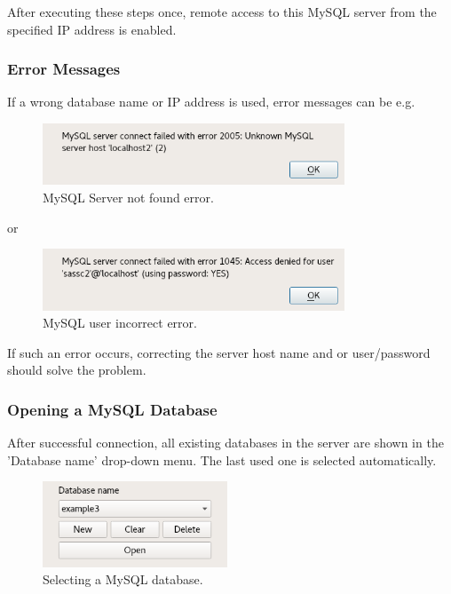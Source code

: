 \documentclass[10pt,letterpaper,extrafontsizes]{memoir}
\begin{document}
After executing these steps once, remote access to this MySQL server from the specified IP address is enabled.

\subsubsection{Error Messages}

If  a  wrong  database  name  or  IP  address  is  used,  error  messages  can  be  e.g.  \\

\begin{figure}[H]
  \center
    \includegraphics[width=9cm,frame]{../screenshots/mysql_connect_error.png}
  \caption{MySQL Server not found error.}
\end{figure}

 or 

\begin{figure}[H]
  \center
    \includegraphics[width=9cm,frame]{../screenshots/mysql_user_error.png}
  \caption{MySQL user incorrect error.}
\end{figure}

If such an error occurs, correcting the server host name and or user/password should solve the problem.

\subsubsection{Opening a MySQL Database}

After successful connection, all existing databases in the server are shown in the 'Database name' drop-down menu. The last used one is selected automatically.

\begin{figure}[H]
  \center
    \includegraphics[width=5.5cm,frame]{../screenshots/mysql_database_selection.png}
  \caption{Selecting a MySQL database.}
  \label{fig:mysql_db_select}
\end{figure}
\end{document}
